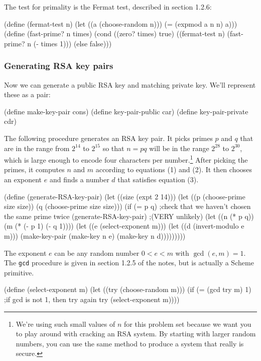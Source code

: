 The test for primality is the Fermat test, described in section 1.2.6:

\beginlisp
(define (fermat-test n)
    (let ((a (choose-random n)))
      (= (expmod a n n) a)))
\null
(define (fast-prime? n times)
    (cond ((zero? times) true)
          ((fermat-test n) (fast-prime? n (- times 1)))
          (else false)))
\endlisp


\subsubsection{Generating RSA key pairs}

Now we can generate a public RSA key and matching private key.  We'll
represent these as a pair:

\beginlisp
(define make-key-pair cons)
(define key-pair-public car)
(define key-pair-private cdr)
\endlisp

The following procedure generates an RSA key pair.  It picks primes
$p$ and $q$ that are in the range from $2^{14}$ to $2^{15}$ so that
$n=pq$ will be in the range $2^{28}$ to $2^{30}$, which is large
enough to encode four characters per number.\footnote{We're using
such small values of $n$ for this problem set because we want you to
play around with cracking an RSA system.  By starting with larger
random numbers, you can use the same method to produce a system that
really is secure.}  After picking the primes, it computes $n$ and $m$
according to equations (1) and (2).  It then chooses an
exponent $e$ and finds a number $d$ that satisfies equation (3).

\beginlisp
(define (generate-RSA-key-pair)
  (let ((size (expt 2 14)))
    (let ((p (choose-prime size size))
          (q (choose-prime size size)))
      (if (= p q)                 ;check that we haven't chosen the same prime twice
          (generate-RSA-key-pair) ;(VERY unlikely)
          (let ((n (* p q))
                (m (* (- p 1) (- q 1))))
            (let ((e (select-exponent m)))
              (let ((d (invert-modulo e m)))
                (make-key-pair (make-key n e) (make-key n d)))))))))
\endlisp

The exponent $e$ can be any random number $0<e<m$ with $\gcd(e,m)=1$.
The {\tt gcd} procedure is given in section 1.2.5 of the notes, but is
actually a Scheme primitive.

\beginlisp
(define (select-exponent m)
  (let ((try (choose-random m)))
    (if (= (gcd try m) 1)       ;if gcd is not 1, then try again
        try
        (select-exponent m))))
\endlisp

